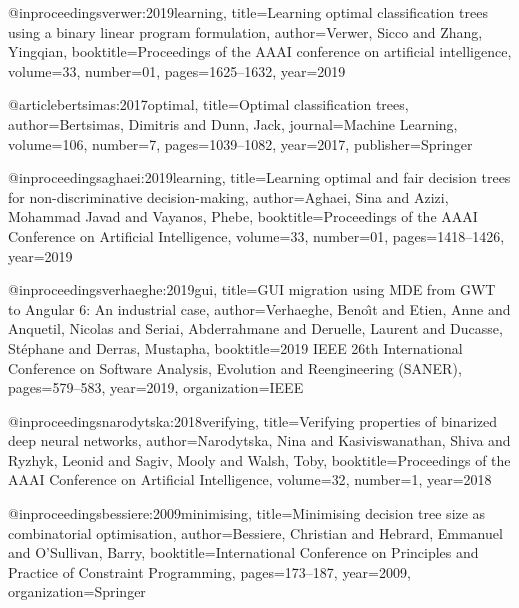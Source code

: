 @inproceedings{verwer:2019learning,
	title={Learning optimal classification trees using a binary linear program formulation},
	author={Verwer, Sicco and Zhang, Yingqian},
	booktitle={Proceedings of the AAAI conference on artificial intelligence},
	volume={33},
	number={01},
	pages={1625--1632},
	year={2019}
}

@article{bertsimas:2017optimal,
	title={Optimal classification trees},
	author={Bertsimas, Dimitris and Dunn, Jack},
	journal={Machine Learning},
	volume={106},
	number={7},
	pages={1039--1082},
	year={2017},
	publisher={Springer}
}

@inproceedings{aghaei:2019learning,
	title={Learning optimal and fair decision trees for non-discriminative decision-making},
	author={Aghaei, Sina and Azizi, Mohammad Javad and Vayanos, Phebe},
	booktitle={Proceedings of the AAAI Conference on Artificial Intelligence},
	volume={33},
	number={01},
	pages={1418--1426},
	year={2019}
}

@inproceedings{verhaeghe:2019gui,
	title={GUI migration using MDE from GWT to Angular 6: An industrial case},
	author={Verhaeghe, Beno{\^\i}t and Etien, Anne and Anquetil, Nicolas and Seriai, Abderrahmane and Deruelle, Laurent and Ducasse, St{\'e}phane and Derras, Mustapha},
	booktitle={2019 IEEE 26th International Conference on Software Analysis, Evolution and Reengineering (SANER)},
	pages={579--583},
	year={2019},
	organization={IEEE}
}

@inproceedings{narodytska:2018verifying,
	title={Verifying properties of binarized deep neural networks},
	author={Narodytska, Nina and Kasiviswanathan, Shiva and Ryzhyk, Leonid and Sagiv, Mooly and Walsh, Toby},
	booktitle={Proceedings of the AAAI Conference on Artificial Intelligence},
	volume={32},
	number={1},
	year={2018}
}

@inproceedings{bessiere:2009minimising,
	title={Minimising decision tree size as combinatorial optimisation},
	author={Bessiere, Christian and Hebrard, Emmanuel and O’Sullivan, Barry},
	booktitle={International Conference on Principles and Practice of Constraint Programming},
	pages={173--187},
	year={2009},
	organization={Springer}
}






















